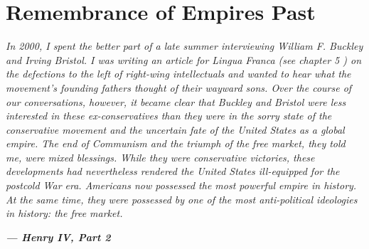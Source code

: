 {\chapter{Remembrance of Empires Past} } {\label{Remembrance of Empires Past} }{\par}{\textit{	In 2000, I spent the better part of a late summer interviewing William F. Buckley and Irving Bristol. I was writing an article for Lingua Franca (see chapter {\color{blue} 5 }) on the defections to the left of right-wing intellectuals and wanted to hear what the movement’s founding fathers thought of their wayward sons. Over the course of our conversations, however, it became clear that Buckley and Bristol were less interested in these ex-conservatives than they were in the sorry state of the conservative movement and the uncertain fate of the United States as a global empire. The end of Communism and the triumph of the free market, they told me, were mixed blessings. While they were conservative victories, these developments had nevertheless rendered the United States ill-equipped for the postcold War era. Americans now possessed the most powerful empire in history. At the same time, they were possessed by one of the most anti-political ideologies in history: the free market.} } {\par}{\par} {\textbf{\textit{	— Henry IV, Part 2} } } {\par} 
